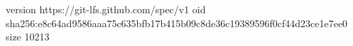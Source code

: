 version https://git-lfs.github.com/spec/v1
oid sha256:e8c64ad9586aaa75c635bfb17b415b09c8de36c19389596f0cf44d23ce1e7ee0
size 10213
